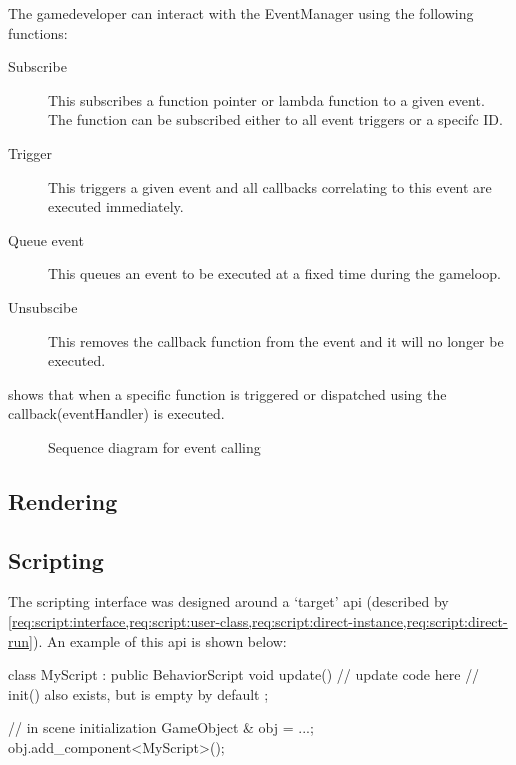 \documentclass{projdoc}
\begin{document}
The gamedeveloper can interact with the EventManager using the following
functions:\noparbreak
\begin{description}
	\item[Subscribe] This subscribes a function pointer or lambda function to a given
		event. The function can be subscribed either to all event triggers or a specifc
		ID.
	\item[Trigger] This triggers a given event and all callbacks correlating to this
		event are executed immediately.
	\item[Queue event] This queues an event to be executed at a fixed time during the
		gameloop.
	\item[Unsubscibe] This removes the callback function from the event and it will no
		longer be executed.
\end{description}

 shows that when a specific function is triggered or dispatched
using the callback(eventHandler) is executed.

\begin{figure}
	\centering
	\caption{Sequence diagram for event calling}
	\label{fig:event-seq}
\end{figure}


\subsection{Rendering}

\subsection{Scripting}

The scripting interface was designed around a `target' \gls{api} (described by
\cref{req:script:interface,req:script:user-class,req:script:direct-instance,req:script:direct-run}).
An example of this \gls{api} is shown below:\noparbreak

\begin{blockcode}
class MyScript : public BehaviorScript {
	void update() {
		// update code here
	}
	// init() also exists, but is empty by default
};

{ // in scene initialization
	GameObject & obj = ...;
	obj.add_component<MyScript>();
}
\end{blockcode}
\end{document}
